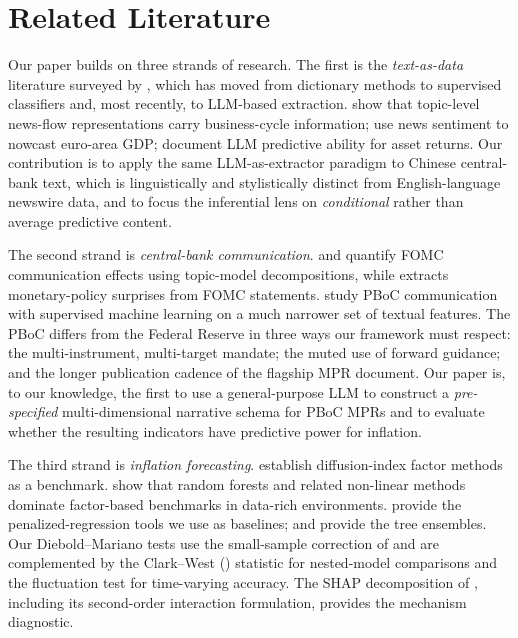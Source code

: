 \documentclass[AER]{AEA}
\begin{document}
\section{Related Literature}\label{sec:literature}

Our paper builds on three strands of research. The first is the
\emph{text-as-data} literature surveyed by \citet{gentzkow2019text}, which
has moved from dictionary methods to supervised classifiers and, most
recently, to LLM-based extraction. \citet{bybee2024business} show that
topic-level news-flow representations carry business-cycle information;
\citet{ashwin2024nowcasting} use news sentiment to nowcast euro-area GDP;
\citet{liu2023chatgpt} document LLM predictive ability for asset returns.
Our contribution is to apply the same LLM-as-extractor paradigm to Chinese
central-bank text, which is linguistically and stylistically distinct from
English-language newswire data, and to focus the inferential lens on
\emph{conditional} rather than average predictive content.

The second strand is \emph{central-bank communication}.
\citet{hansen2016shocking} and \citet{hansen2018transparency} quantify FOMC
communication effects using topic-model decompositions, while
\citet{handlan2020text} extracts monetary-policy surprises from FOMC
statements. \citet{chen2023pboc} study PBoC communication with supervised
machine learning on a much narrower set of textual features. The PBoC
differs from the Federal Reserve in three ways our framework must respect:
the multi-instrument, multi-target mandate; the muted use of forward
guidance; and the longer publication cadence of the flagship MPR document.
Our paper is, to our knowledge, the first to use a general-purpose LLM to
construct a \emph{pre-specified} multi-dimensional narrative schema for
PBoC MPRs and to evaluate whether the resulting indicators have predictive
power for inflation.

The third strand is \emph{inflation forecasting}. \citet{stockwatson2002macro}
establish diffusion-index factor methods as a benchmark.
\citet{medeiros2021forecasting} show that random forests and related
non-linear methods dominate factor-based benchmarks in data-rich
environments. \citet{tibshirani1996regression,zou2005regularization} provide
the penalized-regression tools we use as baselines; \citet{breiman2001random}
and \citet{chen2016xgboost} provide the tree ensembles. Our Diebold--Mariano
tests use the small-sample correction of \citet{harvey1997testing} and are
complemented by the Clark--West (\citeyear{clark2007approximately}) statistic
for nested-model comparisons and the \citet{giacomini2010forecast}
fluctuation test for time-varying accuracy. The SHAP decomposition of
\citet{lundberg2017unified}, including its second-order interaction
formulation, provides the mechanism diagnostic.
\end{document}
